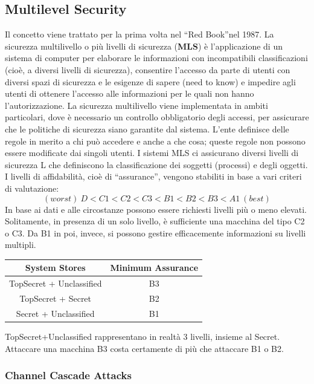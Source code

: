 \subsection{Multilevel Security}
Il concetto viene trattato per la prima volta nel “Red Book”nel 1987.
La sicurezza multilivello o più livelli di sicurezza (\textbf{MLS}) è
l'applicazione di un sistema di computer
per elaborare le informazioni con incompatibili classificazioni (cioè, a diversi
livelli di sicurezza),
consentire l'accesso da parte di utenti con diversi spazi di sicurezza e le
esigenze di sapere (need
to know) e impedire agli utenti di ottenere l'accesso alle informazioni per
le quali non hanno
l'autorizzazione.
La sicurezza multilivello viene implementata in ambiti particolari, dove è
necessario un controllo
obbligatorio degli accessi, per assicurare che le politiche di sicurezza siano
garantite dal sistema.
L'ente definisce delle regole in merito a chi può accedere e anche a che cosa;
queste regole non
possono essere modificate dai singoli utenti.
I sistemi MLS ci assicurano diversi livelli di sicurezza L che definiscono la
classificazione dei
soggetti (processi) e degli oggetti. I livelli di affidabilità, cioè di
“assurance”, vengono stabiliti in
base a vari criteri di valutazione:
\[
      (worst) \ D<C1<C2<C3<B1<B2<B3<A1 \ (best)
\]
In base ai dati e alle circostanze possono essere richiesti livelli più o meno
elevati. Solitamente, in
presenza di un solo livello, è sufficiente una macchina del tipo C2 o C3. Da B1
in poi, invece, si
possono gestire efficacemente informazioni su livelli multipli.
\begin{center}
      \begin{tabular}{ |c|c| }
            \hline
            \textbf{System Stores}   & \textbf{Minimum Assurance} \\
            \hline
            TopSecret + Unclassified & B3                         \\
            \hline
            TopSecret + Secret       & B2                         \\
            \hline
            Secret + Unclassified    & B1                         \\
            \hline
      \end{tabular}
\end{center}
TopSecret+Unclassified rappresentano in realtà 3 livelli, insieme al Secret.
Attaccare una macchina B3 costa certamente di più che attaccare B1 o B2.

\subsubsection{Channel Cascade Attacks}

